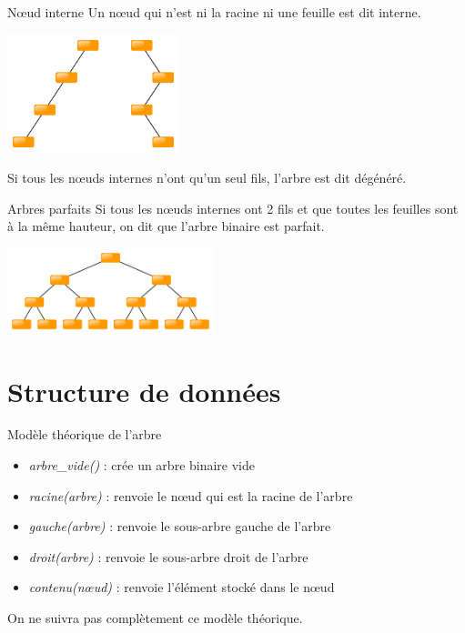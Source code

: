 \documentclass[10pt]{beamer}
\begin{document}
\begin{frame}{N\oe ud interne}
Un n\oe ud qui n'est ni la racine ni une feuille est dit \alert{interne}.\pause
    \begin{center}
    \includegraphics[width=5cm]{img/peigne}
\end{center}
Si tous les n\oe uds internes n'ont qu'un seul fils, l'arbre est dit \alert{dégénéré}.
\end{frame}

\begin{frame}{Arbres parfaits}
    Si tous les n\oe uds internes ont 2 fils et que toutes les feuilles sont à la même hauteur, on dit que l'arbre binaire est \alert{parfait}.
    \begin{center}
        \includegraphics[width=6cm]{img/parfait}
    \end{center}
\end{frame}
\section{Structure de données}
\begin{frame}{Modèle théorique de l'arbre}
    \begin{itemize}
        \item \textit{arbre\_vide()} : crée un arbre binaire vide\pause
        \item \textit{racine(arbre)} : renvoie le n\oe ud qui est la racine de l'arbre\pause
        \item  \textit{gauche(arbre)} : renvoie le sous-arbre gauche de l'arbre\pause
        \item  \textit{droit(arbre)} : renvoie le sous-arbre droit de l'arbre\pause
        \item \textit{contenu(n\oe ud)} : renvoie l'élément stocké dans le n\oe ud\pause
    \end{itemize}
On ne suivra pas complètement ce modèle théorique.
\end{frame}
\end{document}
